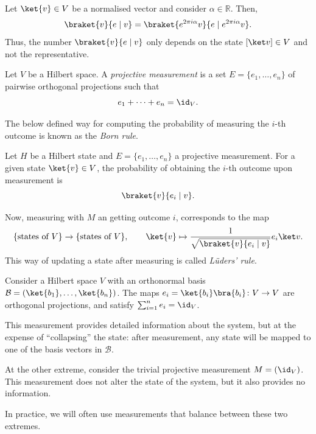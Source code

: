 \documentclass[a4paper,oneside, 12pt]{amsart}
\begin{document}
Let \(\ket{v} \in V\) be a normalised vector and consider  \(\alpha\in \mathbb{R}\).
Then,
\begin{equation*}
  \braket{v}{e \mid v} = \braket{ e^{2\pi i \alpha}v}{e \mid e^{2\pi i \alpha}v}.
\end{equation*}
Thus, the number \(\braket{v}{e \mid v}\) only depends on the state \([\ket v] \in V\) and not the representative.

\begin{definition}\label{def:projective-measurement}
  Let \( V \) be a Hilbert space.
  A \emph{projective measurement} is a set \( E=\{e_1, \dots, e_n\} \) of pairwise orthogonal projections such that
  \begin{equation*}
    e_1 + \dots + e_n = \id_V.
  \end{equation*}
\end{definition}

The below defined way for computing the probability of measuring the \(i\)-th outcome is known as  the \emph{Born rule}.

\begin{definition}\label{def:born-rule}
  Let \(H\) be a Hilbert state and \( E=\{e_1, \dots, e_n\} \) a projective measurement.
  For a given state \( \ket{v} \in V \), the probability of obtaining the \( i\)-th outcome upon measurement is
  \begin{equation*}
    \braket{v}{e_i \mid v}.
  \end{equation*}
\end{definition}

Now, measuring with \(M\) an getting outcome \(i\), corresponds to the map
\begin{equation*}
  \{\text{states of }V\} \to\{ \text{states of }V\}, \qquad \ket {v} \mapsto \frac{1}{\sqrt{\braket{v}{e_{i}\mid v}}} e_{i}\ket v.
\end{equation*}
This way of updating a state after measuring is called \emph{Lüders' rule}.

\begin{example}\label{ex:onb-measures}
  Consider a Hilbert space \( V \) with an orthonormal basis \( \mathcal{B} = (\ket{b_1}, \dots, \ket{b_n}) \).
  The maps \( e_i = \ket{b_i}\bra{b_i} \colon V \to V \) are orthogonal projections, and satisfy \(\sum_{i=1}^n e_i = \id_V\).

  This measurement provides detailed information about the system, but at the expense of ``collapsing'' the state: after measurement, any state will be mapped to one of the basis vectors in \( \mathcal{B} \).

  At the other extreme, consider the trivial projective measurement \( M = (\id_V) \).
  This measurement does not alter the state of the system, but it also provides no information.

  In practice, we will often use measurements that balance between these two extremes.
\end{example}
\end{document}
